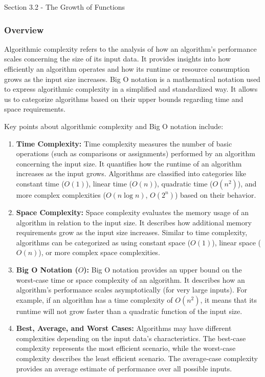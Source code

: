 \begin{notes}{Section 3.2 - The Growth of Functions}
    \subsubsection*{Overview}

    Algorithmic complexity refers to the analysis of how an algorithm's performance scales concerning the size of its input data. It provides insights into how efficiently an algorithm operates 
    and how its runtime or resource consumption grows as the input size increases. Big O notation is a mathematical notation used to express algorithmic complexity in a simplified and standardized 
    way. It allows us to categorize algorithms based on their upper bounds regarding time and space requirements.
    
    Key points about algorithmic complexity and Big O notation include:
    
    \begin{enumerate}
        \item \textbf{Time Complexity:} Time complexity measures the number of basic operations (such as comparisons or assignments) performed by an algorithm concerning the input size. It quantifies 
        how the runtime of an algorithm increases as the input grows. Algorithms are classified into categories like constant time ($O(1)$), linear time ($O(n)$), quadratic time ($O(n^2)$), and more 
        complex complexities ($O(n\log n)$, $O(2^n)$) based on their behavior.
    
        \item \textbf{Space Complexity:} Space complexity evaluates the memory usage of an algorithm in relation to the input size. It describes how additional memory requirements grow as the input 
        size increases. Similar to time complexity, algorithms can be categorized as using constant space ($O(1)$), linear space ($O(n)$), or more complex space complexities.
    
        \item \textbf{Big O Notation ($O$):} Big O notation provides an upper bound on the worst-case time or space complexity of an algorithm. It describes how an algorithm's performance scales 
        asymptotically (for very large inputs). For example, if an algorithm has a time complexity of $O(n^2)$, it means that its runtime will not grow faster than a quadratic function of the input 
        size.
    
        \item \textbf{Best, Average, and Worst Cases:} Algorithms may have different complexities depending on the input data's characteristics. The best-case complexity represents the most efficient 
        scenario, while the worst-case complexity describes the least efficient scenario. The average-case complexity provides an average estimate of performance over all possible inputs.
    

\end{enumerate}
\end{notes}
